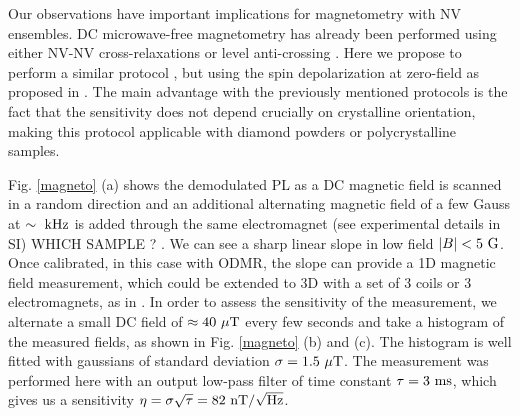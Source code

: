 \documentclass[preprintnumbers,amsmath,amssymb,superscriptaddress,twocolumn,showpacs]{revtex4-2}
\begin{document}
Our observations have important implications for magnetometry with NV ensembles.
DC microwave-free magnetometry has already been performed using either NV-NV cross-relaxations \citep{akhmedzhanov_microwave-free_2017,akhmedzhanov_magnetometry_2019} or level anti-crossing \citep{Wickenbrock, zheng2017level, zheng_microwave-free_2020}. Here we propose to perform a similar protocol , but using the spin depolarization at zero-field as proposed in \cite{filimonenko2018weak, filimonenko2022manifestation}. The main advantage with the previously mentioned protocols is the fact that the sensitivity does not depend crucially on crystalline orientation, making this protocol applicable with diamond powders or polycrystalline samples. 

Fig. \ref{magneto} (a) shows the demodulated PL as a DC magnetic field is scanned in a random direction and an additional alternating magnetic field of a few Gauss at $\sim \ \rm kHz$ is added through the same electromagnet (see experimental details in SI) WHICH SAMPLE ? . We can see a sharp linear slope in low field $\abs{B} < 5\ \rm G$. Once calibrated, in this case with ODMR, the slope can provide a 1D magnetic field measurement, which could be extended to 3D with a set of 3 coils or 3 electromagnets, as in \cite{zheng_microwave-free_2020}. In order to assess the sensitivity of the measurement, we alternate a small DC field of $\approx 40\ \mu\rm{T}$ every few seconds and take a histogram of the measured fields, as shown in Fig. \ref{magneto} (b) and (c). The histogram is well fitted with gaussians of standard deviation $\sigma=1.5\ \mu \rm T$. The measurement was performed here with an output low-pass filter of time constant $\tau=3\ \rm ms$, which gives us a sensitivity $\eta=\sigma \sqrt{\tau}=82\ \rm{nT}/\sqrt{\rm Hz}$.
\end{document}
